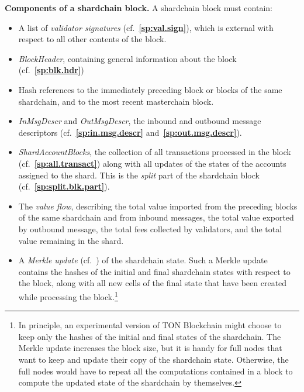 \documentclass[12pt,oneside]{article}
\def\makepoint#1{\medbreak\noindent{\bf #1.\ }}
\def\nxsubpoint{\refstepcounter{subsubsection}%
  \smallbreak\makepoint{\thesubsubsection}}
\def\refpoint#1{{\rm\textbf{\ref{#1}}}}
\let\ptref=\refpoint
\def\emb#1{\textbf{#1.}}
\begin{document}
\nxsubpoint\label{sp:shard.blk.comp}\emb{Components of a shardchain block}
A shardchain block must contain:
\begin{itemize}
\item A list of {\em validator signatures\/} (cf.~\ptref{sp:val.sign}), which is external with respect to all other contents of the block.
\item {\em BlockHeader}, containing general information about the block (cf.~\ptref{sp:blk.hdr})
\item Hash references to the immediately preceding block or blocks of the same shardchain, and to the most recent masterchain block.
\item {\em InMsgDescr\/} and {\em OutMsgDescr}, the inbound and outbound message descriptors (cf.~\ptref{sp:in.msg.descr} and~\ptref{sp:out.msg.descr}).
\item {\em ShardAccountBlocks}, the collection of all transactions processed in the block (cf.~\ptref{sp:all.transact}) along with all updates of the states of the accounts assigned to the shard. This is the {\em split\/} part of the shardchain block (cf.~\ptref{sp:split.blk.part}).
\item The {\em value flow}, describing the total value imported from the preceding blocks of the same shardchain and from inbound messages, the total value exported by outbound message, the total fees collected by validators, and the total value remaining in the shard.
\item A {\em Merkle update\/} (cf.~\cite[3.1]{TVM}) of the shardchain state. Such a Merkle update contains the hashes of the initial and final shardchain states with respect to the block, along with all new cells of the final state that have been created while processing the block.\footnote{In principle, an experimental version of TON Blockchain might choose to keep only the hashes of the initial and final states of the shardchain. The Merkle update increases the block size, but it is handy for full nodes that want to keep and update their copy of the shardchain state. Otherwise, the full nodes would have to repeat all the computations contained in a block to compute the updated state of the shardchain by themselves.}
\end{itemize}
\end{document}
